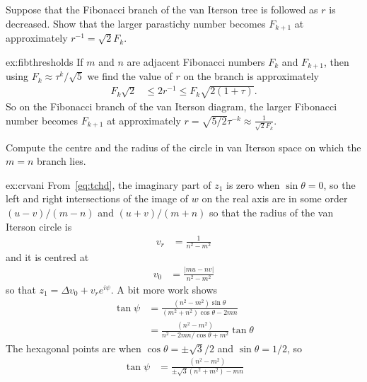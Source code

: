 \begin{jExercise}\label{ex:fibthresholds}
Suppose that the Fibonacci branch of the van Iterson tree is followed as $r$ is decreased.
Show that the larger parastichy number becomes $F_{k+1}$ at approximately  $r^{-1}={\sqrt{2}F_k}$.
\end{jExercise}
\begin{jAnswer}{ex:fibthresholds}{
If $m$ and $n$ are adjacent Fibonacci numbers $F_{k}$ and $F_{k+1}$, then using $F_k\approx \tau^k/\sqrt{5}
$ we find the value of $r$ on the branch is approximately
	\begin{align}
  F_k \sqrt{2} &\leq	2 r^{-1}  \leq F_k \sqrt{2(1+\tau)}.
\end{align}
So on the Fibonacci branch of the van Iterson diagram, 
the larger Fibonacci number becomes $F_{k+1}$ at approximately $r=\sqrt{5/2}\tau^{-k}\approx \frac{1}{\sqrt{2}F_k}$.
}\end{jAnswer}





\begin{jExercise}\label{ex:crvani}
		Compute the centre and the radius of the circle in van Iterson space on which the $m=n$ branch lies.
\end{jExercise}

\begin{jAnswer}{ex:crvani}{
		From~\eqref{eq:tchd}, the imaginary part of $z_1$ is zero when  $\sin\theta=0$, so the left and right intersections of the image of $w$ on the real axis are in some order $(u-v)/(m-n)$ and $(u+v)/(m+n)$ so that the radius of the van Iterson circle
		is
\begin{align}	
			v_r &= \frac{1}{n^2-m^2}
\end{align}
and it is centred at
\begin{align}			v_0 &= \frac{|m u - n v|}{n^2-m^2}
\end{align}	so that $z_1=\Delta v_0 + v_r e^{i\psi}$. 
A bit more work shows
\begin{align}
	\tan \psi &= \frac{ (n^2-m^2)\sin \theta}{(m^2+n^2)\cos\theta-2mn}
	\\
	&= \frac{ (n^2-m^2)}{n^2-2mn/\cos\theta+m^2}\tan\theta
\end{align}
The hexagonal points are when $\cos\theta=\pm\sqrt{3}/2$ and $\sin\theta=1/2$, so
\begin{align}
	\tan \psi 
	&= \frac{ (n^2-m^2)}{\pm\sqrt{3}(n^2+m^2)-mn }
\end{align}
}
	\end{jAnswer}
	
